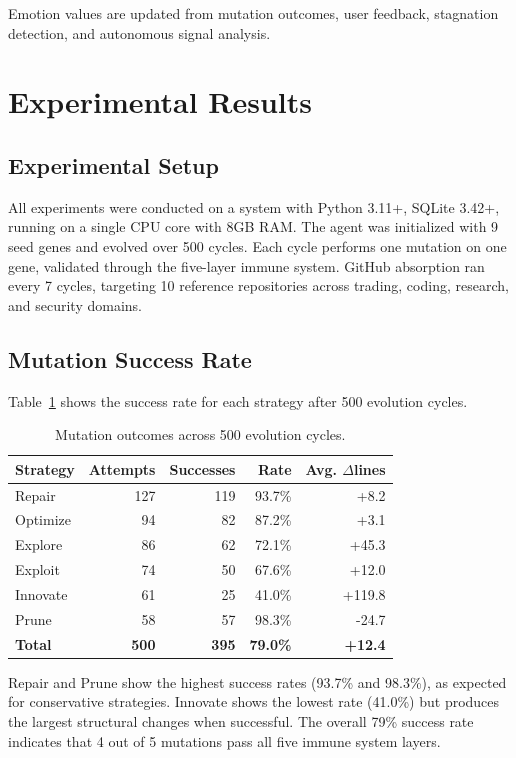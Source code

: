 \documentclass[11pt,a4paper]{article}
\begin{document}
Emotion values are updated from mutation outcomes, user feedback, stagnation detection, and autonomous signal analysis.

\section{Experimental Results}

\subsection{Experimental Setup}

All experiments were conducted on a system with Python 3.11+, SQLite 3.42+, running on a single CPU core with 8GB RAM. The agent was initialized with 9 seed genes and evolved over 500 cycles. Each cycle performs one mutation on one gene, validated through the five-layer immune system. GitHub absorption ran every 7 cycles, targeting 10 reference repositories across trading, coding, research, and security domains.

\subsection{Mutation Success Rate}

Table~\ref{tab:mutations} shows the success rate for each strategy after 500 evolution cycles.

\begin{table}[H]
\centering
\begin{tabular}{@{}lrrrr@{}}
\toprule
\textbf{Strategy} & \textbf{Attempts} & \textbf{Successes} & \textbf{Rate} & \textbf{Avg. $\Delta$lines} \\
\midrule
Repair & 127 & 119 & 93.7\% & +8.2 \\
Optimize & 94 & 82 & 87.2\% & +3.1 \\
Explore & 86 & 62 & 72.1\% & +45.3 \\
Exploit & 74 & 50 & 67.6\% & +12.0 \\
Innovate & 61 & 25 & 41.0\% & +119.8 \\
Prune & 58 & 57 & 98.3\% & -24.7 \\
\midrule
\textbf{Total} & \textbf{500} & \textbf{395} & \textbf{79.0\%} & \textbf{+12.4} \\
\bottomrule
\end{tabular}
\caption{Mutation outcomes across 500 evolution cycles.}
\label{tab:mutations}
\end{table}

Repair and Prune show the highest success rates (93.7\% and 98.3\%), as expected for conservative strategies. Innovate shows the lowest rate (41.0\%) but produces the largest structural changes when successful. The overall 79\% success rate indicates that 4 out of 5 mutations pass all five immune system layers.
\end{document}
